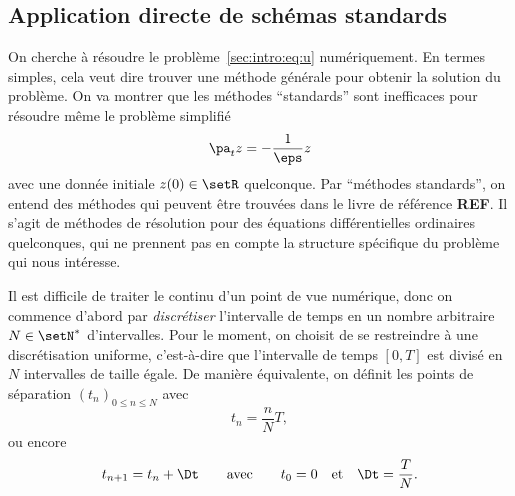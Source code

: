 




\subsection*{Application directe de schémas standards}


On cherche à résoudre le problème~\eqref{sec:intro:eq:u} numériquement.
En termes simples, cela veut dire trouver une méthode générale pour
obtenir la solution du problème. On va montrer que les méthodes
\enquote{standards} sont inefficaces pour résoudre même le problème
simplifié 
\begin{equation} \label{sec:intro:eq:pb_zlin}
    \pa_t z = -\frac{1}{\eps}z
\end{equation}
avec une donnée initiale $z(0) \in \setR$ quelconque. Par
\enquote{méthodes standards}, on entend des méthodes qui peuvent être
trouvées dans le livre de référence \textbf{REF}.
Il s'agit de méthodes de résolution pour des équations différentielles
ordinaires quelconques, qui ne prennent pas en compte la structure
spécifique du problème qui nous intéresse. 


Il est difficile de traiter le continu d'un point de vue numérique, donc
on commence d'abord par \textit{discrétiser} l'intervalle de temps en un
nombre arbitraire $N \in \setN^*$ d'intervalles.
%
%
\noindent%
Pour le moment, on choisit de se restreindre à une discrétisation
uniforme, c'est-à-dire que l'intervalle de temps $[0,T]$ est divisé en
$N$ intervalles de taille égale. De manière équivalente, on définit les
points de séparation $(t_n)_{0 \leq n \leq N}$ avec 
\begin{equation*}
    t_n = \frac{n}{N} T ,
\end{equation*}
ou encore 
\begin{equation*}
    t_{n+1} = t_n + \Dt
    \qquad\text{avec}\qquad
    t_0 = 0 \quad\text{et}\quad \Dt = \frac{T}{N} .
\end{equation*}

